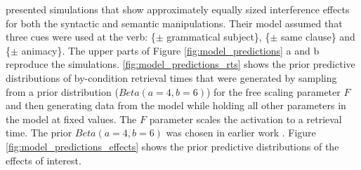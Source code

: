 \documentclass[a4paper, man, floatsintext]{apa7}
\begin{document}
\textcite{mertzen} presented simulations that show approximately equally sized interference effects 
for both the syntactic and semantic manipulations. Their model assumed that three cues were used at the verb: \{$\pm$ grammatical subject\}, \{$\pm$ same clause\} and \{$\pm$ animacy\}. The upper parts of Figure \ref{fig:model_predictions} a and b reproduce the \textcite{mertzen} simulations. \ref{fig:model_predictions_rts} shows the prior predictive distributions of by-condition retrieval times that were generated by sampling from a prior distribution ($Beta(a=4,b=6)$) for the free scaling parameter $F$ and then generating data from the model while holding all other parameters in the model at fixed values. The $F$ parameter scales the activation to a retrieval time. The prior $Beta(a=4,b=6)$ was chosen in earlier work \parencite{jaeger_etal_2020,vasishth2020_abc}. Figure \ref{fig:model_predictions_effects} shows the prior predictive distributions of the effects of interest.
\end{document}
